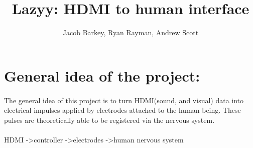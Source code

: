\documentclass{report}
\author{Jacob Barkey, Ryan Rayman, Andrew Scott}
\title{Lazyy: HDMI to human interface}
\begin{document}
\section{General idea of the project:}
\paragraph{}
\textrm{The general idea of this project is to turn HDMI(sound, and visual) data into electrical impulses applied by electrodes attached to the human being. These pulses are theoretically able to be registered via the nervous system.}

\paragraph{}
\begin{center}
\textrm{\large HDMI -\textgreater controller -\textgreater electrodes -\textgreater human nervous system}
\end{center}
\end{document}
